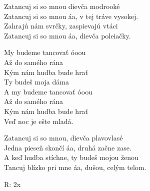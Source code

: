 
\ve{}
Zatancuj si so mnou dievča modrooké\\
Zatancuj si so mnou áa, v tej tráve vysokej.\\
Zahrajú nám svrčky, zaspievajú vtáci\\
Zatancuj si so mnou áa, dievča poleiačky.

\cho{}
My budeme tancovať óoou\\
Až do samého rána\\
Kým nám hudba bude hrať\\
Ty budeš moja dáma\\
A my budeme tancovať óoou\\
Až do samého rána\\
Kým nám hudba bude hrať\\
Veď noc je ešte mladá.


\ve{}
Zatancuj si so mnou, dievča plavovlasé\\
Jedna pieseň skončí áa, druhá začne zase.\\
A keď hudba stíchne, ty budeš mojou ženou\\
Tancuj blízko pri mne áa, dušou, celým telom.

\re{}R: 2x
\esong{}